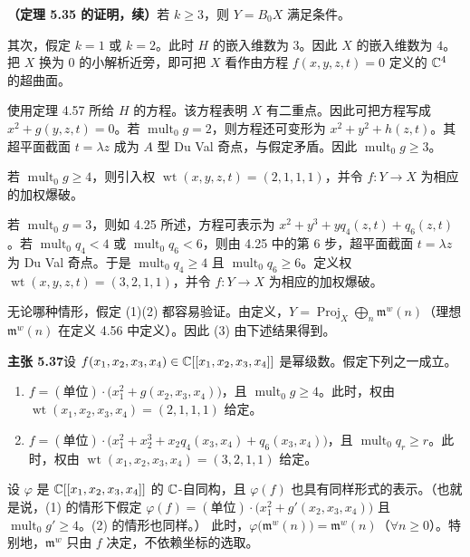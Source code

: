 \par\medskip\noindent\textbf{（定理 5.35 的证明，续）}\quad 若 $k\ge3$，则 $Y=B_0X$ 满足条件。

其次，假定 $k=1$ 或 $k=2$。此时 $H$ 的嵌入维数为 $3$。因此 $X$ 的嵌入维数为 $4$。把 $X$ 换为 $0$ 的小解析近旁，即可把 $X$ 看作由方程 $f(x,y,z,t)=0$ 定义的 $\mathbb{C}^4$ 的超曲面。

使用定理 4.57 所给 $H$ 的方程。该方程表明 $X$ 有二重点。因此可把方程写成 $x^2+g(y,z,t)=0$。若 $\operatorname{mult}_0g=2$，则方程还可变形为 $x^2+y^2+h(z,t)$。其超平面截面 $t=\lambda z$ 成为 $A$ 型 Du Val 奇点，与假定矛盾。因此 $\operatorname{mult}_0g\ge3$。

若 $\operatorname{mult}_0g\ge4$，则引入权 $\operatorname{wt}(x,y,z,t)=(2,1,1,1)$，并令 $f\colon Y\to X$ 为相应的加权爆破。

若 $\operatorname{mult}_0g=3$，则如 4.25 所述，方程可表示为 $x^2+y^3+yq_4(z,t)+q_6(z,t)$。若 $\operatorname{mult}_0q_4<4$ 或 $\operatorname{mult}_0q_6<6$，则由 4.25 中的第 6 步，超平面截面 $t=\lambda z$ 为 Du Val 奇点。于是 $\operatorname{mult}_0q_4\ge4$ 且 $\operatorname{mult}_0q_6\ge6$。定义权 $\operatorname{wt}(x,y,z,t)=(3,2,1,1)$，并令 $f\colon Y\to X$ 为相应的加权爆破。

无论哪种情形，假定 (1)(2) 都容易验证。由定义，$Y=\operatorname{Proj}_X\bigoplus_n\mathfrak{m}^w(n)$（理想 $\mathfrak{m}^w(n)$ 在定义 4.56 中定义）。因此 (3) 由下述结果得到。

\par\medskip\noindent\textbf{主张 5.37}\quad 设 $f(x_1,x_2,x_3,x_4)\in\mathbb{C}[[x_1,x_2,x_3,x_4]]$ 是幂级数。假定下列之一成立。
\begin{enumerate}[label=(\arabic*),leftmargin=*]
\item $f=(\text{单位})\cdot\bigl(x_1^2+g(x_2,x_3,x_4)\bigr)$，且 $\operatorname{mult}_0g\ge4$。此时，权由 $\operatorname{wt}(x_1,x_2,x_3,x_4)=(2,1,1,1)$ 给定。
\item $f=(\text{单位})\cdot\bigl(x_1^2+x_2^3+x_2q_4(x_3,x_4)+q_6(x_3,x_4)\bigr)$，且 $\operatorname{mult}_0q_r\ge r$。此时，权由 $\operatorname{wt}(x_1,x_2,x_3,x_4)=(3,2,1,1)$ 给定。
\end{enumerate}
设 $\varphi$ 是 $\mathbb{C}[[x_1,x_2,x_3,x_4]]$ 的 $\mathbb{C}$-自同构，且 $\varphi(f)$ 也具有同样形式的表示。（也就是说，(1) 的情形下假定 $\varphi(f)=(\text{单位})\cdot\bigl(x_1^2+g'(x_2,x_3,x_4)\bigr)$ 且 $\operatorname{mult}_0g'\ge4$。(2) 的情形也同样。）
此时，$\varphi\bigl(\mathfrak{m}^w(n)\bigr)=\mathfrak{m}^w(n)$（$\forall n\ge0$）。特别地，$\mathfrak{m}^w$ 只由 $f$ 决定，不依赖坐标的选取。

